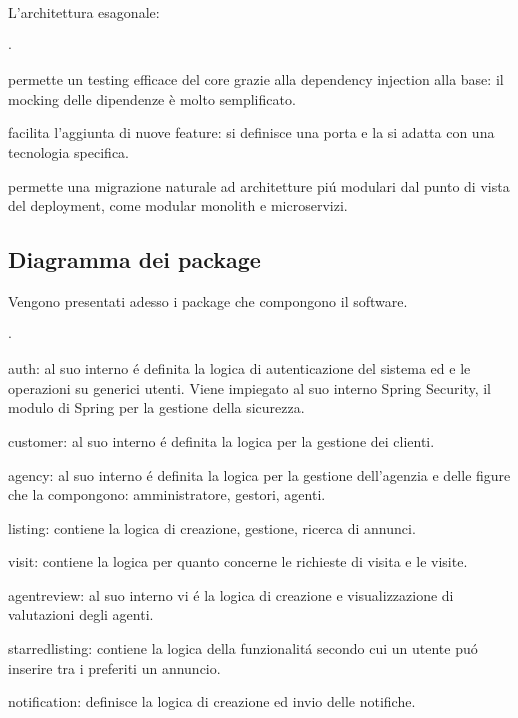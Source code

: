 L’architettura esagonale: 
\begin{list}{$\cdot$}{}
    \item permette un testing efficace del core grazie alla dependency injection 
    alla base: il mocking delle dipendenze è molto semplificato.
    \item facilita l’aggiunta di nuove feature: si definisce una porta e la si 
    adatta con una tecnologia specifica.
    \item permette una migrazione naturale ad architetture piú modulari dal punto 
    di vista del deployment, come modular monolith e microservizi.
\end{list}

\subsection{Diagramma dei package}
Vengono presentati adesso i package che compongono il software.
\begin{list}{$\cdot$}{}
    \item auth: al suo interno é definita la logica di autenticazione del sistema ed
    e le operazioni su generici utenti. Viene impiegato al suo interno Spring Security,
    il modulo di Spring per la gestione della sicurezza.
    \item customer: al suo interno é definita la logica per la gestione
    dei clienti.
    \item agency: al suo interno é definita la logica per la gestione
    dell'agenzia e delle figure che la compongono: amministratore, gestori, agenti.
    \item listing: contiene la logica di creazione, gestione, ricerca di annunci.
    \item visit: contiene la logica per quanto concerne le richieste di visita e 
    le visite.
    \item agentreview: al suo interno vi é la logica di creazione e visualizzazione di 
    valutazioni degli agenti.
    \item starredlisting: contiene la logica della funzionalitá secondo cui
    un utente puó inserire tra i preferiti un annuncio.
    \item notification: definisce la logica di creazione ed invio delle
    notifiche.
\end{list}

